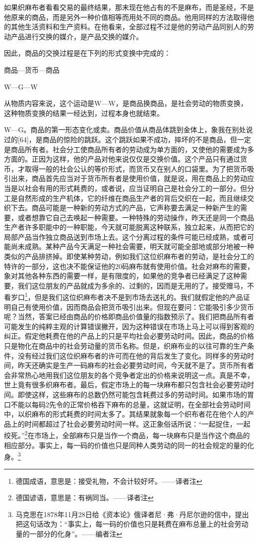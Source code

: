 \documentclass{ctexbook}
\begin{document}
        如果织麻布者看看交易的最终结果，那末现在他占有的不是麻布，而是圣经，不是他原来的商品，而是另外一种价值相等而用处不同的商品。他用同样的方法取得他的其他生活资料和生产资料。在他看来，全部过程不过是他的劳动产品同别人的劳动产品进行交换的媒介，是产品交换的媒介。
        
        因此，商品的交换过程是在下列的形式变换中完成的：

        商品—货币—商品

        W—G—W

        从物质内容来说，这个运动是W—W，是商品换商品，是社会劳动的物质变换，这种物质变换的结果一经达到，过程本身也就结束。
        
        W—G。商品的第一形态变化或卖。商品价值从商品体跳到金体上，象我在别处说过的[64]，是商品的惊险的跳跃。这个跳跃如果不成功，摔坏的不是商品，但一定是商品所有者。社会分工使商品所有者的劳动成为单方面的，又使他的需要成为多方面的。正因为这样，他的产品对他来说仅仅是交换价值。这个产品只有通过货币，才取得一般的社会公认的等价形式，而货币又在别人的口袋里。为了把货币吸引出来，商品首先应当对于货币所有者是使用价值，就是说，用在商品上的劳动应当是以社会有用的形式耗费的，或者说，应当证明自己是社会分工的一部分。但分工是自然形成的生产机体，它的纤维在商品生产者的背后交织在一起，而且继续交织下去。商品可能是一种新的劳动方式的产品，它声称要去满足一种新产生的需要，或者想靠它自己去唤起一种需要。一种特殊的劳动操作，昨天还是同一个商品生产者许多职能中的一种职能，今天就可能脱离这种联系，独立起来，从而把它的局部产品当作独立商品送到市场上去。这个分离过程的条件可能已经成熟，或者可能尚未成熟。某种产品今天满足一种社会需要，明天就可能全部地或部分地被一种类似的产品排挤掉。即使某种劳动，例如我们这位织麻布者的劳动，是社会分工的特许的一部分，这也决不能保证他的20码麻布就有使用价值。社会对麻布的需要，象对其他各种东西的需要一样，是有限度的，如果他的竞争者已经满足了这种需要，我们这位朋友的产品就成为多余的、过剩的，因而是无用的了。接受赠马，不看岁口\footnote{德国成语，意思是：接受礼物，不会计较好坏。——译者注}，但是我们这位织麻布者决不是到市场去送礼的。我们就假定他的产品证明自己有使用价值，因而商品会把货币吸引出来。但现在要问：它能吸引多少货币呢？当然，答案已经由商品的价格即商品价值量的指数预示了。我们把商品所有者可能发生的纯粹主观的计算错误撇开，因为这种错误在市场上马上可以得到客观的纠正。假定他耗费在他的产品上的只是平均社会必要劳动时间。因此，商品的价格只是物化在商品中的社会劳动量的货币名称。但是，织麻布业的以往可靠的生产条件，没有经过我们这位织麻布者的许可而在他的背后发生了变化。同样多的劳动时间，昨天还确实是生产一码麻布的社会必要劳动时间，今天就不是了。货币所有者会非常热心地用我们这位朋友的各个竞争者定出的价格来说明这一点。真是不幸，世上竟有很多织麻布者。最后，假定市场上的每一块麻布都只包含社会必要劳动时间。即使这样，这些麻布的总数仍然可能包含耗费过多的劳动时间。如果市场的胃口不能以每码2先令的正常价格吞下麻布的总量，这就证明，在全部社会劳动时间中，以织麻布的形式耗费的时间太多了。其结果就象每一个织布者花在他个人的产品上的时间都超过了社会必要劳动时间一样。这正象俗话所说：“一起捉住，一起绞死。”\footnote{德国谚语，意思是：有祸同当。——译者注}在市场上，全部麻布只是当作一个商品，每一块麻布只是当作这个商品的相应部分。事实上，每一码的价值也只是同种人类劳动的同一的社会规定的量的化身。\footnote{马克思在1878年11月28日给《资本论》俄译者尼·弗·丹尼尔逊的信中，提出把这句话改为：“事实上，每一码的价值也只是耗费在麻布总量上的社会劳动量的一部分的化身”。——编者注}
\end{document}
